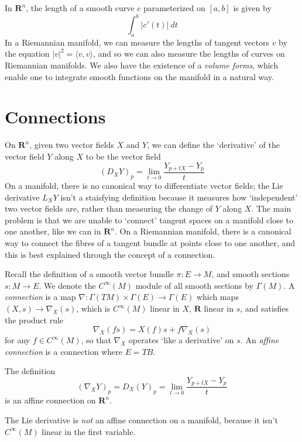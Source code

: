 In $\mathbf{R}^n$, the length of a smooth curve $c$ parameterized on $[a,b]$ is given by
%
\[ \int_a^b |c'(t)|\ dt \]
%
In a Riemannian manifold, we can measure the lengths of tangent vectors $v$ by the equation $|v|^2 = \langle v, v \rangle$, and so we can also measure the lengths of curves on Riemannian manifolds. We also have the existence of a \emph{volume forms}, which enable one to integrate smooth functions on the manifold in a natural way.

\section{Connections}

On $\mathbf{R}^n$, given two vector fields $X$ and $Y$, we can define the `derivative' of the vector field $Y$ along $X$ to be the vector field
%
\[ (D_X Y)_p = \lim_{t \to 0} \frac{Y_{p + tX} - Y_p}{t} \]
%
On a manifold, there is no canonical way to differentiate vector fields; the Lie derivative $L_XY$ isn't a staisfying definition because it measures how `independent' two vector fields are, rather than measuring the change of $Y$ along $X$. The main problem is that we are unable to `connect' tangent spaces on a manifold close to one another, like we can in $\mathbf{R}^n$. On a Riemannian manifold, there is a canonical way to connect the fibres of a tangent bundle at points close to one another, and this is best explained through the concept of a connection.

Recall the definition of a smooth vector bundle $\pi: E \to M$, and smooth sections $s: M \to E$. We denote the $C^\infty(M)$ module of all smooth sections by $\Gamma(M)$. A \emph{connection} is a map $\nabla: \Gamma(TM) \times \Gamma(E) \to \Gamma(E)$ which maps $(X,s) \to \nabla_X(s)$, which is $C^\infty(M)$ linear in $X$, $\mathbf{R}$ linear in $s$, and satisfies the product rule
%
\[ \nabla_X(fs) = X(f)s + f\nabla_X(s) \]
%
for any $f \in C^\infty(M)$, so that $\nabla_X$ operates `like a derivative' on $s$. An \emph{affine connection} is a connection where $E = TB$.

\begin{example}
    The definition
    \[ (\nabla_X Y)_p = D_X(Y)_p = \lim_{t \to 0} \frac{Y_{p + tX} - Y_p}{t} \]
    is an affine connection on $\mathbf{R}^n$.
\end{example}

\begin{example}
    The Lie derivative is {\it not} an affine connection on a manifold, because it isn't $C^\infty(M)$ linear in the first variable.
\end{example}

